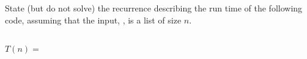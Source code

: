 \begin{prob}
    State (but do not solve) the recurrence describing the run time of the following code,
    assuming that the input, , is a list of size $n$.

    \inputminted[lastline=10]{python}{\thisdir/code.py}

    $T(n) =$ 

\end{prob}
